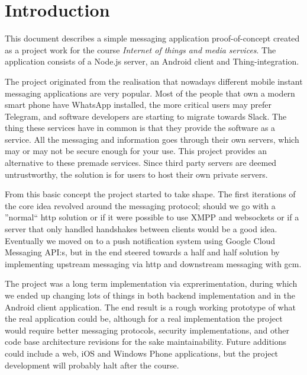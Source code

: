 
\section{Introduction}
This document describes a simple messaging application proof-of-concept created as a project work for the course \emph{Internet of things and media services}. The application consists of a Node.js server, an Android client and Thing\texttrademark-integration.

The project originated from the realisation that nowadays different mobile instant messaging applications are very popular. Most of the people that own a modern smart phone have WhatsApp installed, the more critical users may prefer Telegram, and software developers are starting to migrate towards Slack. The thing these services have in common is that they provide the software as a service. All the messaging and information goes through their own servers, which may or may not be secure enough for your use. This project provides an alternative to these premade services. Since third party servers are deemed untrustworthy, the solution is for users to host their own private servers.

From this basic concept the project started to take shape. The first iterations of the core idea revolved around the messaging protocol; should we go with a ''normal`` http solution or if it were possible to use XMPP and websockets or if a server that only handled handshakes between clients would be a good idea. Eventually we moved on to a push notification system using Google Cloud Messaging API:s, but in the end steered towards a half and half solution by implementing upstream messaging via http and downstream messaging with gcm.

The project was a long term implementation via exprerimentation, during which we ended up changing lots of things in both backend implementation and in the Android client application. The end result is a rough working prototype of what the real application could be, although for a real implementation the project would require better messaging protocols, security implementations, and other code base architecture revisions for the sake maintainability. Future additions could include a web, iOS and Windows Phone applications, but the project development will probably halt after the course.

